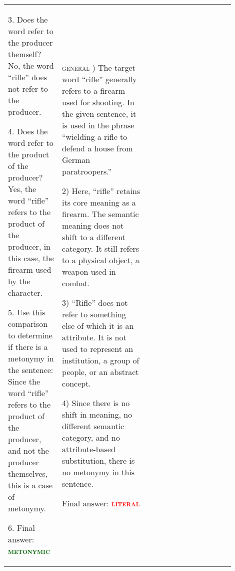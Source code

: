 \documentclass[11pt]{article}
\newcommand{\tr}[1]{\textcolor{red}{#1}}
\newcommand{\tg}[1]{\textcolor{darkgreen}{#1}}
\begin{document}
{\begin{longtable}{|p{0.20\linewidth}|p{0.35\linewidth}|p{0.35\linewidth}|}
3. Does the word refer to the producer themself? No, the word ``rifle'' does not refer to the producer.

4. Does the word refer to the product of the producer? Yes, the word ``rifle'' refers to the product of the producer, in this case, the firearm used by the character.

5. Use this comparison to determine if there is a metonymy in the sentence: Since the word ``rifle'' refers to the product of the producer, and not the producer themselves, this is a case of metonymy.

6. Final answer: \tg{\textsc{\textbf{metonymic}}}

&

\textsc{general} \newline
1) The target word ``rifle'' generally refers to a firearm used for shooting. In the given sentence, it is used in the phrase ``wielding a rifle to defend a house from German paratroopers.''

2) Here, ``rifle'' retains its core meaning as a firearm.
The semantic meaning does not shift to a different category. It still refers to a physical object, a weapon used in combat.

3) ``Rifle'' does not refer to something else of which it is an attribute. It is not used to represent an institution, a group of people, or an abstract concept.

4) Since there is no shift in meaning, no different semantic category, and no attribute-based substitution, there is no metonymy in this sentence.

Final answer: \tr{\textsc{\textbf{literal}}} \\

\end{longtable}
}
\endgroup
\end{document}

